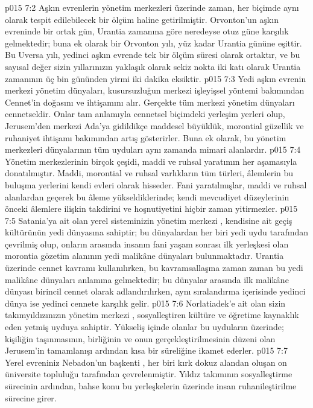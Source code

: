 \vs p015 7:2 Aşkın evrenlerin yönetim merkezleri üzerinde zaman, her biçimde aynı olarak tespit edilebilecek bir ölçüm haline getirilmiştir. Orvonton’un aşkın evreninde bir ortak gün, Urantia zamanına göre neredeyse otuz güne karşılık gelmektedir; buna ek olarak bir Orvonton yılı, yüz kadar Urantia gününe eşittir. Bu Uversa yılı, yedinci aşkın evrende tek bir ölçüm süresi olarak ortaktır, ve bu sayısal değer sizin yıllarınızın yaklaşık olarak sekiz nokta iki katı olarak Urantia zamanının üç bin gününden yirmi iki dakika eksiktir.
\vs p015 7:3 Yedi aşkın evrenin merkezi yönetim dünyaları, kusursuzluğun merkezi işleyişsel yöntemi bakımından Cennet’in doğasını ve ihtişamını alır. Gerçekte tüm merkezi yönetim dünyaları cennetseldir. Onlar tam anlamıyla cennetsel biçimdeki yerleşim yerleri olup, Jerusem’den merkezi Ada’ya gidildikçe maddesel büyüklük, morontial güzellik ve ruhaniyet ihtişamı bakımından artış gösterirler. Buna ek olarak, bu yönetim merkezleri dünyalarının tüm uyduları aynı zamanda mimari alanlardır.
\vs p015 7:4 Yönetim merkezlerinin birçok çeşidi, maddi ve ruhsal yaratımın her aşamasıyla donatılmıştır. Maddi, morontial ve ruhsal varlıkların tüm türleri, âlemlerin bu buluşma yerlerini kendi evleri olarak hisseder. Fani yaratılmışlar, maddi ve ruhsal alanlardan geçerek bu âleme yükseldiklerinde; kendi mevcudiyet düzeylerinin önceki âlemlere ilişkin takdirini ve hoşnutiyetini hiçbir zaman yitirmezler.
\vs p015 7:5 Satania’ya ait olan yerel sisteminizin yönetim merkezi , kendisine ait geçiş kültürünün yedi dünyasına sahiptir; bu dünyalardan her biri yedi uydu tarafından çevrilmiş olup, onların arasında insanın fani yaşam sonrası ilk yerleşkesi olan morontia gözetim alanının yedi malikâne dünyaları bulunmaktadır. Urantia üzerinde cennet kavramı kullanılırken, bu kavramsallaşma zaman zaman bu yedi malikâne dünyaları anlamına gelmektedir; bu dünyalar arasında ilk malikâne dünyası birincil cennet olarak adlandırılırken, aynı sıralandırma içerisinde yedinci dünya ise yedinci cennete karşılık gelir.
\vs p015 7:6 Norlatiadek’e ait olan sizin takımyıldızınızın yönetim merkezi , sosyalleştiren kültüre ve öğretime kaynaklık eden yetmiş uyduya sahiptir. Yükseliş içinde olanlar bu uyduların üzerinde; kişiliğin taşınmasının, birliğinin ve onun gerçekleştirilmesinin düzeni olan Jerusem’in tamamlanışı ardından kısa bir süreliğine ikamet ederler.
\vs p015 7:7 Yerel evreniniz Nebadon’un başkenti , her biri kırk dokuz alandan oluşan on üniversite topluluğu tarafından çevrelenmiştir. Yıldız takımının sosyalleştirme sürecinin ardından, bahse konu bu yerleşkelerin üzerinde insan ruhanileştirilme sürecine girer.
